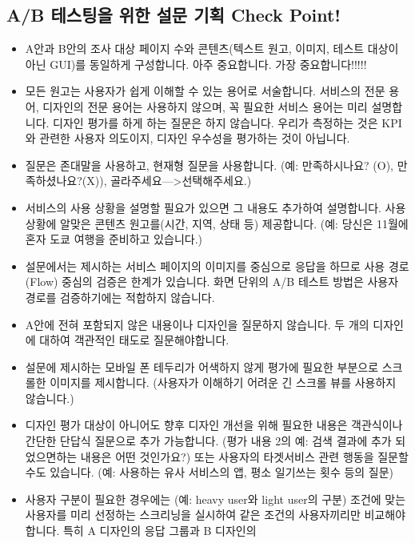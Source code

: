 \documentclass[
  letterpaper,
]{book}
\providecommand{\tightlist}{%
  \setlength{\itemsep}{0pt}\setlength{\parskip}{0pt}}\usepackage{longtable,booktabs,array}
\begin{document}
\subsection{A/B 테스팅을 위한 설문 기획 Check
Point!}\label{ab-uxd14cuxc2a4uxd305uxc744-uxc704uxd55c-uxc124uxbb38-uxae30uxd68d-check-point}

\begin{itemize}
\tightlist
\item
  A안과 B안의 조사 대상 페이지 수와 콘텐츠(텍스트 원고, 이미지, 테스트
  대상이 아닌 GUI)를 동일하게 구성합니다. 아주 중요합니다. 가장
  중요합니다!!!!!
\item
  모든 원고는 사용자가 쉽게 이해할 수 있는 용어로 서술합니다. 서비스의
  전문 용어, 디자인의 전문 용어는 사용하지 않으며, 꼭 필요한 서비스
  용어는 미리 설명합니다. 디자인 평가를 하게 하는 질문은 하지 않습니다.
  우리가 측정하는 것은 KPI와 관련한 사용자 의도이지, 디자인 우수성을
  평가하는 것이 아닙니다.
\item
  질문은 존대말을 사용하고, 현재형 질문을 사용합니다. (예: 만족하시나요?
  (O), 만족하셨나요?(X)), 골라주세요---\textgreater 선택해주세요.)
\item
  서비스의 사용 상황을 설명할 필요가 있으면 그 내용도 추가하여
  설명합니다. 사용 상황에 알맞은 콘텐츠 원고를(시간, 지역, 상태 등)
  제공합니다. (예: 당신은 11월에 혼자 도쿄 여행을 준비하고 있습니다.)
\item
  설문에서는 제시하는 서비스 페이지의 이미지를 중심으로 응답을 하므로
  사용 경로(Flow) 중심의 검증은 한계가 있습니다. 화면 단위의 A/B 테스트
  방법은 사용자 경로를 검증하기에는 적합하지 않습니다.
\item
  A안에 전혀 포함되지 않은 내용이나 디자인을 질문하지 않습니다. 두 개의
  디자인에 대하여 객관적인 태도로 질문해야합니다.
\item
  설문에 제시하는 모바일 폰 테두리가 어색하지 않게 평가에 필요한
  부분으로 스크롤한 이미지를 제시합니다. (사용자가 이해하기 어려운 긴
  스크롤 뷰를 사용하지 않습니다.)
\item
  디자인 평가 대상이 아니어도 향후 디자인 개선을 위해 필요한 내용은
  객관식이나 간단한 단답식 질문으로 추가 가능합니다. (평가 내용 2의 예:
  검색 결과에 추가 되었으면하는 내용은 어떤 것인가요?) 또는 사용자의
  타겟서비스 관련 행동을 질문할 수도 있습니다. (예: 사용하는 유사
  서비스의 앱, 평소 일기쓰는 횟수 등의 질문)
\item
  사용자 구분이 필요한 경우에는 (예: heavy user와 light user의 구분)
  조건에 맞는 사용자를 미리 선정하는 스크리닝을 실시하여 같은 조건의
  사용자끼리만 비교해야합니다. 특히 A 디자인의 응답 그룹과 B 디자인의

\end{itemize}
\end{document}
